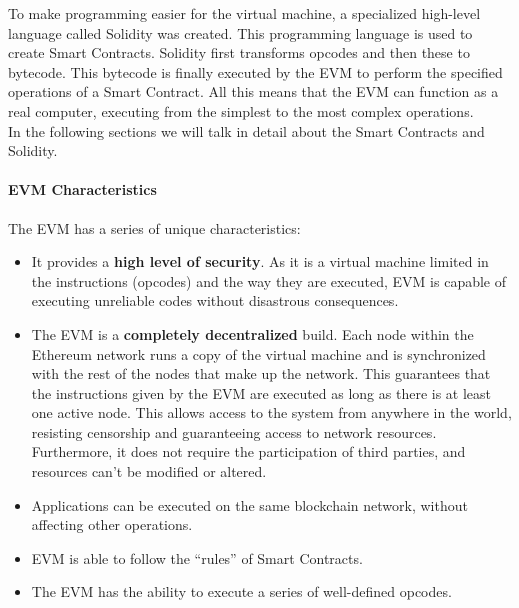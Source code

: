 \documentclass[a4paper, 12pt]{article} %
\begin{document}
                To make programming easier for the virtual machine, a specialized high-level language called Solidity was created. This programming language is used to create Smart Contracts. Solidity first transforms opcodes and then these to bytecode. This bytecode is finally executed by the EVM to perform the specified operations of a  Smart Contract. All this means that the EVM can function as a real computer, executing from the simplest to the most complex operations.\\
                
                In the following sections we will talk in detail about the Smart Contracts and Solidity.
                
            \paragraph{EVM Characteristics}
                The EVM has a series of unique characteristics\cite{ethereumGavin}\cite{ethereumDocu}:
                \begin{itemize}
                    \item It provides a \textbf{high level of security}. As it is a virtual machine limited in the instructions (opcodes) and the way they are executed, EVM is capable of executing unreliable codes without disastrous consequences.
                    \item The EVM is a \textbf{completely decentralized} build. Each node within the Ethereum network runs a copy of the virtual machine and is synchronized with the rest of the nodes that make up the network. This guarantees that the instructions given by the EVM are executed as long as there is at least one active node. This allows access to the system from anywhere in the world, resisting censorship and guaranteeing access to network resources. Furthermore, it does not require the participation of third parties, and resources can’t be modified or altered.
                    \item Applications can be executed on the same blockchain network, without affecting other operations.
                    \item EVM is able to follow the “rules” of Smart Contracts.
                    \item The EVM has the ability to execute a series of well-defined opcodes.
                \end{itemize}
                
\end{document}
